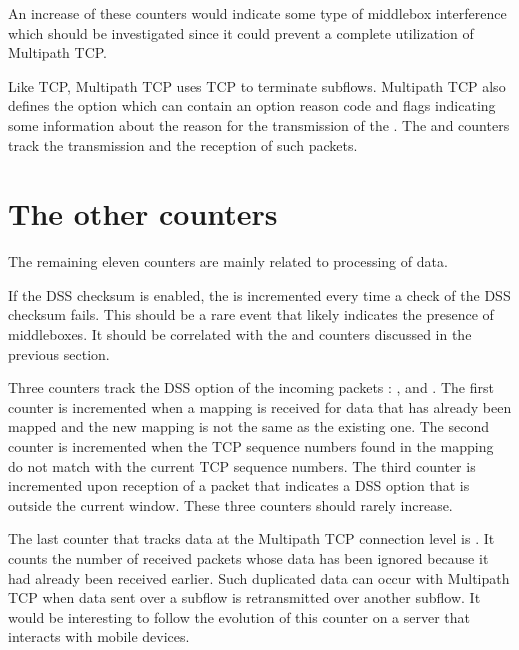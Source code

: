 \documentclass[letterpaper,10pt,english]{sphinxmanual}
\begin{document}
\sphinxAtStartPar
An increase of
these counters would indicate some type of middlebox interference which
should be investigated since it could prevent a complete utilization of
Multipath TCP.

\sphinxAtStartPar
Like TCP, Multipath TCP uses TCP  to terminate subflows. Multipath
TCP also defines the  option which can contain an option reason
code and flags indicating some information about the reason for the
transmission of the . The  and 
counters track the transmission and the reception of such  packets.


\section{The other counters}
\label{\detokenize{nstat-mptcp:the-other-counters}}
\sphinxAtStartPar
The remaining eleven counters are mainly related to processing of data.

\sphinxAtStartPar
If the DSS checksum is enabled, the  is incremented
every time a check of the DSS checksum fails. This should be a rare event that
likely indicates the presence of middleboxes. It should be correlated with
the  and  counters discussed in the
previous section.

\sphinxAtStartPar
Three counters track the DSS option of the incoming packets :
,  and
. The first counter is
incremented when a mapping is received for data that has already been mapped
and the new mapping is not the same as the existing one. The second counter
is incremented when the TCP sequence numbers found in the mapping do not
match with the current TCP sequence numbers. The third counter is incremented
upon reception of a packet that indicates a DSS option that is outside the
current window. These three counters should rarely increase.

\sphinxAtStartPar
The last counter that tracks data at the Multipath TCP connection
level is . It counts the number of received
packets whose data has been ignored because it had already been received
earlier. Such duplicated data can occur with Multipath TCP when data
sent over a subflow is retransmitted over another subflow. It would
be interesting to follow the evolution of this counter on a server that
interacts with mobile devices.
\end{document}
